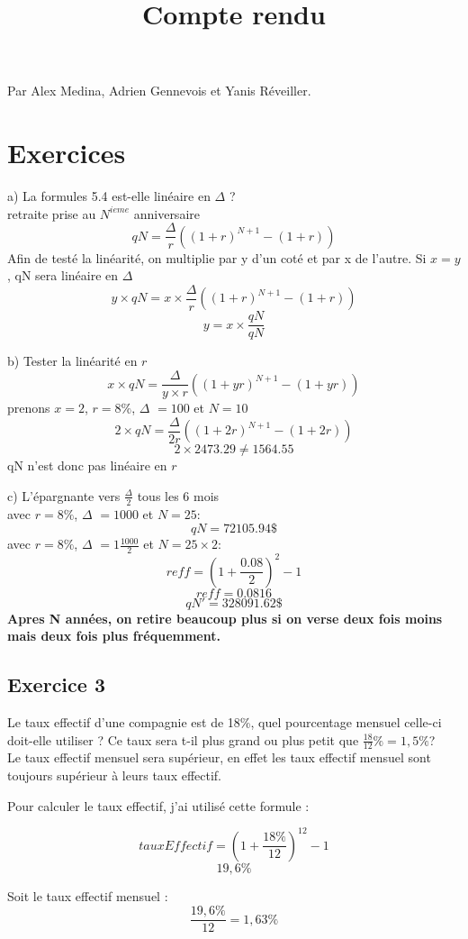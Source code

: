 \documentclass[12pt]{article}
\title{Compte rendu}
\begin{document}
\maketitle
Par Alex Medina, Adrien Gennevois et Yanis Réveiller.

\tableofcontents
\newpage
\section{Exercices}

a) La formules 5.4 est-elle linéaire en $\Delta$ ?\\
retraite prise au $N^{ieme}$ anniversaire
$$qN = \frac{\Delta}{r}((1+r)^{N+1} - (1+r))$$
Afin de testé la linéarité, on multiplie par y d'un coté et par x de l'autre. Si $x=y$, qN sera linéaire en $\Delta$
$$y\times qN = x\times\frac{\Delta}{r}((1+r)^{N+1} - (1+r))$$
$$y = x\times \frac{qN}{qN}$$

b) Tester la linéarité en $r$
$$x\times qN = \frac{\Delta}{y\times r}((1+yr)^{N+1} - (1+yr))$$
prenons $x=2$, $r=8\%$, $\Delta$ $=100$ et $N=10$
$$2\times qN = \frac{\Delta}{2r}((1+2r)^{N+1} - (1+2r))$$
$$2\times 2473.29 \neq 1564.55$$
qN n'est donc pas linéaire en $r$

c) L'épargnante vers $\frac{\Delta}{2}$ tous les 6 mois
\\avec $r=8\%$, $\Delta$ $=1000$ et $N=25$:
$$qN = 72105.94\$$$
avec $r=8\%$, $\Delta$ $=1\frac{1000}{2}$ et $N=25\times 2$:
$$reff=(1+\frac{0.08}{2})^2-1$$
$$reff=0.0816$$
$$qN' = 328091.62\$$$
\textbf{Apres N années, on retire beaucoup plus si on verse deux fois moins mais deux fois plus fréquemment.}

\subsection{Exercice 3}

\qquad Le taux effectif d'une compagnie est de 18\%, quel pourcentage mensuel celle-ci doit-elle utiliser ? Ce taux sera t-il plus grand ou plus petit que $\frac{18}{12}\% = 1,5\%$?
\\

\qquad Le taux effectif mensuel sera supérieur, en effet les taux effectif mensuel sont toujours supérieur à leurs taux effectif.

\qquad Pour calculer le taux effectif, j'ai utilisé cette formule :

$$tauxEffectif=(1+\frac{18\%}{12})^{12}-1$$
$$19,6\%$$

\qquad Soit le taux effectif mensuel : 
$$\frac{19,6\%}{12}=1,63\%$$
\end{document}

